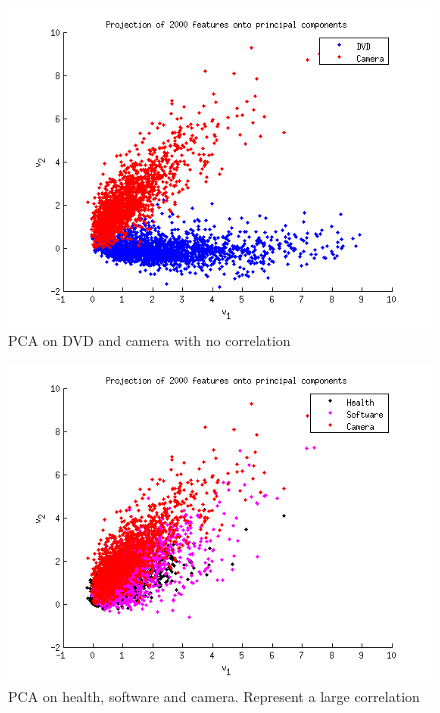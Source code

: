 \begin{figure}[H]
\centering
\includegraphics[scale = 1]{../Plottar/pca_nocorr.png}
\caption{PCA on DVD and camera with no correlation}
\end{figure} 

\begin{figure}[H]
\centering
\includegraphics[scale = 1]{../Plottar/pca_largecorr.png}
\caption{PCA on health, software and camera. Represent a large correlation}
\end{figure} 

